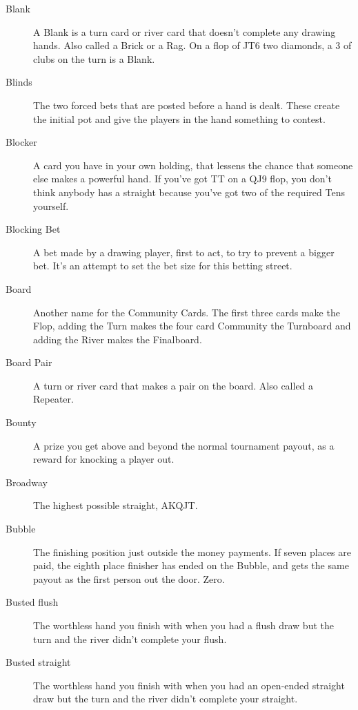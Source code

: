 \begin{description}
\item[Blank] A Blank is a turn card or river card that doesn't
complete any drawing hands. Also called a Brick or a Rag. On a flop of
JT6 two diamonds, a 3 of clubs on the turn is a Blank.

\item[Blinds] The two forced bets that are posted before a hand is
dealt. These create the initial pot and give the players in the hand
something to contest.

\item[Blocker] A card you have in your own holding, that lessens
the chance that someone else makes a powerful hand. If you've got TT
on a QJ9 flop, you don't think anybody has a straight because you've
got two of the required Tens yourself.

\item[Blocking Bet] A bet made by a drawing player, first to act,
to try to prevent a bigger bet. It's an attempt to set the bet size
for this betting street.

\item[Board] Another name for the Community Cards. The first three
cards make the Flop, adding the Turn makes the four card Community the
Turnboard and adding the River makes the Finalboard.

\item[Board Pair] A turn or river card that makes a pair on the
board. Also called a Repeater.

\item[Bounty] A prize you get above and beyond the normal tournament
payout, as a reward for knocking a player out.

\item[Broadway] The highest possible straight, AKQJT.

\item[Bubble] The finishing position just outside the money payments.
If seven places are paid, the eighth place finisher has ended on the
Bubble, and gets the same payout as the first person out the door. Zero.

\item[Busted flush] The worthless hand you finish with when you had a
flush draw but the turn and the river didn't complete your flush.

\item[Busted straight] The worthless hand you finish with when you had
an open-ended straight draw but the turn and the river didn't complete
your straight.


\end{description}
